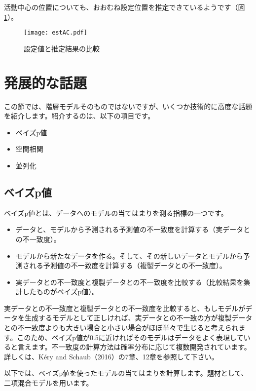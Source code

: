 活動中心の位置についても、おおむね設定位置を推定できているようです（図\ref{estAC}）。
\begin{figure}[htb]
\begin{center}
\graphicspath{{4_hm/figs/}}
\texttt{[image: estAC.pdf]}\\
\caption{設定値と推定結果の比較}
\label{estAC}
\end{center}
\end{figure}

\clearpage
\section{発展的な話題}
この節では、階層モデルそのものではないですが、いくつか技術的に高度な話題を紹介します。紹介するのは、以下の項目です。
\begin{itemize}
  \item ベイズp値
  \item 空間相関
  \item 並列化
\end{itemize}
\subsection{ベイズp値}
ベイズp値とは、データへのモデルの当てはまりを測る指標の一つです。
\begin{itemize}
\item データと、モデルから予測される予測値の不一致度を計算する（実データとの不一致度）。
\item モデルから新たなデータを作る。そして、その新しいデータとモデルから予測される予測値の不一致度を計算する（複製データとの不一致度）。
\item 実データとの不一致度と複製データとの不一致度を比較する（比較結果を集計したものがベイズp値）。
\end{itemize}
実データとの不一致度と複製データとの不一致度を比較すると、もしモデルがデータを生成するモデルとして正しければ、実データとの不一致の方が複製データとの不一致度よりも大きい場合と小さい場合がほぼ半々で生じると考えられます。このため、ベイズp値が0.5に近ければそのモデルはデータをよく表現していると言えます。不一致度の計算方法は確率分布に応じて複数開発されています。詳しくは、K\'{e}ry and Schaub（2016）の7章、12章を参照して下さい。

以下では、ベイズp値を使ったモデルの当てはまりを計算します。題材として、二項混合モデルを用います。

